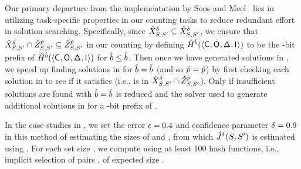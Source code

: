 Our primary departure from the implementation by Soos and
Meel~\cite{SM19} lies in utilizing task-specific properties in our
counting tasks to reduce redundant effort in solution searching.
Specifically, since
$\hat{X}^{\delta}_{{S_{}},{S_{}'}}
\subseteq
\check{X}^{\delta}_{{S_{}},{S_{}'}}$, we
ensure that
$\hat{X}^{\delta}_{{S_{}},{S_{}'}}
\cap
\check{Z}^{\check{p}}_{{S_{}},{S_{}'}}
\subseteq
\hat{Z}^{\hat{p}}_{{S_{}},{S_{}'}}$
in our counting by defining
$\hat{H}^{\hat{b}}(\langle
\mathsf{C}_{},\mathsf{O}_{},\mathsf{\Delta}_{},\mathsf{I}_{}\rangle)$ to be the
\hashFnOutputPrefixBitsForIntersect-bit prefix of
$\check{H}^{\check{b}}(\langle
\mathsf{C}_{},\mathsf{O}_{},\mathsf{\Delta}_{},\mathsf{I}_{}\rangle)$ for
$\hat{b} \le
\check{b}$.  Then once we have generated
solutions in
\UnionWithDeclassSubset{\secretsSet{}}{\secretsSetAlt{}}{\hashFnOutputPrefixForUnion},
we speed up finding solutions in
\IntersectWithDeclassSubset{\secretsSet{}}{\secretsSetAlt{}}{\hashFnOutputPrefixForIntersect}
for $\hat{b} =
\check{b}$ (and so
$\hat{p} = \check{p}$) by
first checking each solution in
\UnionWithDeclassSubset{\secretsSet{}}{\secretsSetAlt{}}{\hashFnOutputPrefixForUnion}
to see if it satisfies \satPropIntersect (i.e., is in
$\hat{X}^{\delta}_{{S_{}},{S_{}'}}
\cap
\check{Z}^{\check{p}}_{{S_{}},{S_{}'}}$).
Only if insufficient solutions are found with
$\hat{b} =
\check{b}$ is
\hashFnOutputPrefixBitsForIntersect reduced and the solver used to
generate additional solutions in
\IntersectWithDeclassSubset{\secretsSet{}}{\secretsSetAlt{}}{\hashFnOutputPrefixForIntersect}
for \hashFnOutputPrefixForIntersect a
\hashFnOutputPrefixBitsForIntersect-bit prefix of
\hashFnOutputPrefixForUnion.

In the case studies in , we set the error $\epsilon=0.4$
and confidence parameter $\delta=0.9$ in this method of
estimating the sizes of
\possibleTriplesDiffWithDeclass{\secretsSet{}}{\secretsSetAlt{}} and
\possibleTriplesUnionWithDeclass{\secretsSet{}}{\secretsSetAlt{}},
from which $\hat{J}^{\delta_{\mbox{}}}_{}(S_{}, S_{}')$ is
estimated using . For each set size
\secretsSetSize, we compute \JaccardWithDeclass{\secretsSetSize} using
at least 100 hash functions, i.e., implicit selection of pairs
\secretsSet{}, \secretsSetAlt{} of expected size \secretsSetSize.

